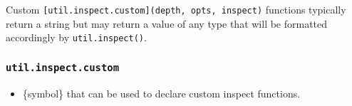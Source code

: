 \begin{Shaded}
\begin{Highlighting}[]
\OperatorTok{=}  \NormalTok{(}\NormalTok{)}\OperatorTok{;}

\OperatorTok{;}
\end{Highlighting}
\end{Shaded}

Custom \texttt{{[}util.inspect.custom{]}(depth,\ opts,\ inspect)}
functions typically return a string but may return a value of any type
that will be formatted accordingly by \texttt{util.inspect()}.

\begin{Shaded}
\begin{Highlighting}[]
\OperatorTok{=} \NormalTok{(}\NormalTok{)}\OperatorTok{;}

\OperatorTok{=}\NormalTok{ \{ }\OperatorTok{:} \NormalTok{ \}}\OperatorTok{;}
\NormalTok{obj[util}\NormalTok{] }\OperatorTok{=}\KeywordTok{=\textgreater{}}\NormalTok{ \{}
  \NormalTok{ \{ }\OperatorTok{:} \NormalTok{ \}}\OperatorTok{;}
\NormalTok{\}}\OperatorTok{;}

\OperatorTok{;}
\end{Highlighting}
\end{Shaded}

\subsubsection{\texorpdfstring{\texttt{util.inspect.custom}}{util.inspect.custom}}\label{util.inspect.custom}

\begin{itemize}
\tightlist
\item
  \{symbol\} that can be used to declare custom inspect functions.
\end{itemize}

